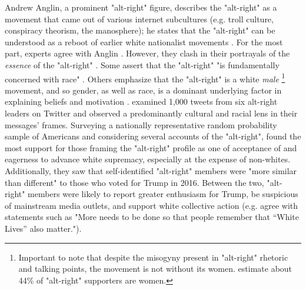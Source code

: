 \documentclass[acmlarge, screen, authorversion]{acmart}
\begin{document}
Andrew Anglin, a prominent "alt-right" figure, describes the "alt-right"
as a movement that came out of various internet subcultures (e.g. troll
culture, conspiracy theorism, the manosphere); he states that the "alt-right" can be understood as a reboot of earlier
white nationalist movements \cite{andrewanglinNormieGuideAltRight}. For the most part, experts agree with Anglin \cite{mainRiseAltRight2018, hawleyAltRightWhatEveryone2018, lyonsInsurgentSupremacistsFar2018}.
However, they clash in their portrayals of the \textit{essence} of the "alt-right" \cite{forscherPsychologicalProfileAltRight2020}. Some assert that the "alt-right" "is fundamentally concerned
with race" \cite{hawleyMakingSenseAltright2017}. Others emphasize that the "alt-right" is a white
\textit{male} \footnote{Important to note that despite the misogyny present in
	"alt-right" rhetoric and talking points, the movement is not without its
	women. \citet{forscherPsychologicalProfileAltRight2020} estimate about 44\% of "alt-right"
supporters are women.}
movement, and so gender, as well as race, is a dominant underlying
factor in explaining beliefs and motivation \cite{kuszWinningBiglySporting2019}. \citet{gallaherMainstreamingWhiteSupremacy2020}
examined 1,000 tweets from six alt-right leaders on Twitter and observed
a predominantly cultural and racial lens in their messages’ frames.
Surveying a nationally representative random probability sample of
Americans and considering several accounts of the "alt-right",
\citet{forscherPsychologicalProfileAltRight2020} found the most support for those framing
the "alt-right" profile as one of acceptance of and eagerness to advance
white supremacy, especially at the expense of non-whites. Additionally,
they saw that self-identified "alt-right" members were "more similar
than different" to those who voted for Trump in 2016. Between the two, "alt-right" members were likely to
report greater enthusiasm for Trump, be suspicious of mainstream
media outlets, and support white collective action (e.g. agree with
statements such as "More needs to be done so that people remember
that ``White Lives'' also matter.").
\end{document}
